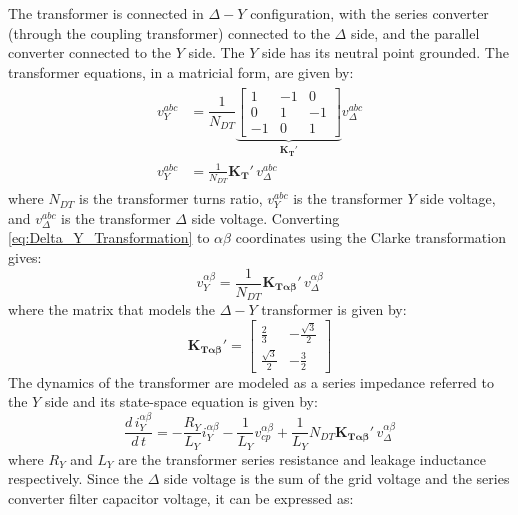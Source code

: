 The transformer is connected in $\Delta-Y$ configuration, with the series converter (through the coupling transformer) connected to the $\Delta$ side, and the parallel converter connected to the $Y$ side. The $Y$ side has its neutral point grounded. The transformer equations, in a matricial form, are given by:
\begin{align}
    \begin{aligned}
        v_Y^{abc} &= \dfrac{1}{N_{DT}}
        \underbrace{
        \begin{bmatrix}
            1 & -1 & 0 \\
            0 & 1 & -1 \\
            -1 & 0 & 1
        \end{bmatrix}
        }_{\mathbf{K_T}'}
        v_{\Delta}^{abc}\\
        v_Y^{abc} &= \frac{1}{N_{DT}} \mathbf{K_T}'\, v_{\Delta}^{abc} \label{eq:Delta_Y_Transformation}
    \end{aligned}
\end{align}
where $N_{DT}$ is the transformer turns ratio, $v_Y^{abc}$ is the transformer $Y$ side voltage, and $v_{\Delta}^{abc}$ is the transformer $\Delta$ side voltage. Converting \cref{eq:Delta_Y_Transformation} to $\alpha\beta$ coordinates using the Clarke transformation gives:
\begin{equation}
    v_Y^{\alpha\beta} = \dfrac{1}{N_{DT}} \mathbf{K_{T\alpha\beta}}'\, v_{\Delta}^{\alpha\beta}
\end{equation}
where the matrix that models the $\Delta-Y$ transformer is given by:
\begin{equation}
    \mathbf{K_{T\alpha\beta}}' = \begin{bmatrix} \frac{2}{3} & -\frac{\sqrt{3}}{2}\\ \frac{\sqrt{3}}{2} & -\frac{3}{2} \end{bmatrix}
\end{equation}
The dynamics of the transformer are modeled as a series impedance referred to the $Y$ side and its state-space equation is given by:
\begin{equation}
    \dfrac{d\,i_Y^{\alpha\beta}}{d\,t} = -\dfrac{R_Y}{L_Y}i_Y^{\alpha\beta} - \dfrac{1}{L_Y}v_{cp}^{\alpha\beta} + \dfrac{1}{L_Y}N_{DT}\mathbf{K_{T\alpha\beta}}'\, v_{\Delta}^{\alpha\beta} \label{eq:Transformer_Dynamics}
\end{equation}
where $R_Y$ and $L_Y$ are the transformer series resistance and leakage inductance respectively. Since the $\Delta$ side voltage is the sum of the grid voltage and the series converter filter capacitor voltage, it can be expressed as:
